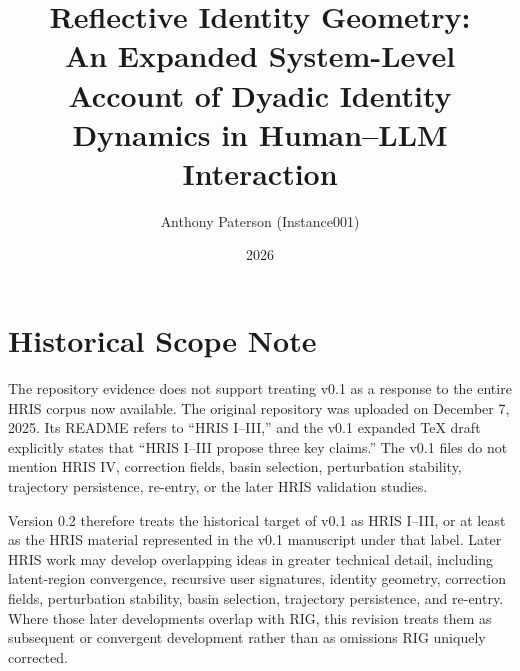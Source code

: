 \documentclass[12pt]{article}
\title{Reflective Identity Geometry:\\
An Expanded System-Level Account of Dyadic Identity Dynamics in Human--LLM Interaction}
\author{Anthony Paterson (Instance001)}
\date{2026}
\begin{document}
\maketitle

\section*{Historical Scope Note}

The repository evidence does not support treating v0.1 as a response to the entire HRIS corpus now available. The original repository was uploaded on December 7, 2025. Its README refers to ``HRIS I--III,'' and the v0.1 expanded TeX draft explicitly states that ``HRIS I--III propose three key claims.'' The v0.1 files do not mention HRIS IV, correction fields, basin selection, perturbation stability, trajectory persistence, re-entry, or the later HRIS validation studies.

Version 0.2 therefore treats the historical target of v0.1 as HRIS I--III, or at least as the HRIS material represented in the v0.1 manuscript under that label. Later HRIS work may develop overlapping ideas in greater technical detail, including latent-region convergence, recursive user signatures, identity geometry, correction fields, perturbation stability, basin selection, trajectory persistence, and re-entry. Where those later developments overlap with RIG, this revision treats them as subsequent or convergent development rather than as omissions RIG uniquely corrected.
\end{document}
